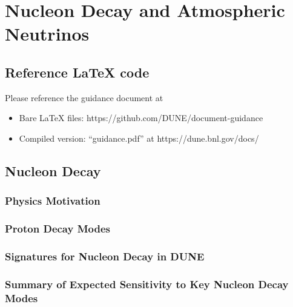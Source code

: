 \chapter{Nucleon Decay and Atmospheric Neutrinos}
\label{ch:physics-atmpdk}

\section{Reference LaTeX code}

Please reference the guidance document at 

\begin{itemize}
\item Bare LaTeX files: https://github.com/DUNE/document-guidance
\item Compiled version: ``guidance.pdf'' at https://dune.bnl.gov/docs/
\end{itemize}


\section{Nucleon Decay}
\label{sec:physics-atmpdk-ndk}

\subsection{Physics Motivation}
\label{sec:physics-atmpdk-ndk-motiv}

\subsection{Proton Decay Modes} 
\label{sec:physics-atmpdk-ndk-modes}


\subsection{Signatures for Nucleon Decay in DUNE}
\label{sec:physics-atmpdk-ndk-sig}


\subsection{Summary of Expected Sensitivity to Key Nucleon Decay Modes}
\label{sec:physics-atmpdk-ndk-sensitivity}



